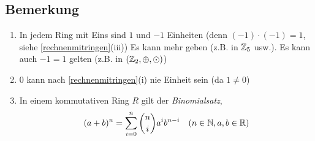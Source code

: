 \subsection{Bemerkung}

\begin{enumerate}
	\item
	In jedem Ring mit Eins sind $1$ und $-1$ Einheiten (denn $(-1) \cdot (-1) = 1$, siehe \ref{rechnenmitringen}(iii))
	Es kann mehr geben (z.B. in $\mathbb{Z}_5$ usw.).
	Es kann auch $-1 = 1$ gelten (z.B. in $(\mathbb{Z}_2, \oplus, \odot)$)
	
	\item
	$0$ kann nach  \ref{rechnenmitringen}(i) nie Einheit sein (da $1 \neq 0$)
	
	\item
	In einem kommutativen Ring $R$ gilt der \emph{Binomialsatz},
	\[(a+b)^n = \sum_{i=0}^{n}\binom{n}{i}a^ib^{n-i} \quad (n \in \mathbb{N}, a, b \in \mathbb{R})\]
	
	
\end{enumerate}